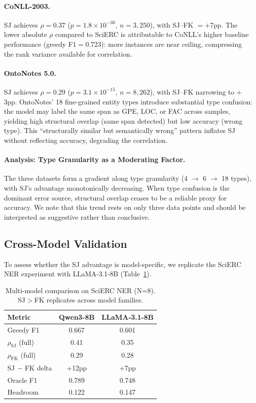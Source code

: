 \documentclass[11pt]{article}
\begin{document}
\paragraph{CoNLL-2003.}
SJ achieves $\rho{=}0.37$ ($p{=}1.8 \times 10^{-30}$, $n{=}3{,}250$), with SJ--FK $= +$7pp.
The lower absolute $\rho$ compared to SciERC is attributable to CoNLL's higher baseline performance (greedy F1$=$0.723): more instances are near ceiling, compressing the rank variance available for correlation.

\paragraph{OntoNotes 5.0.}
SJ achieves $\rho{=}0.29$ ($p{=}3.1 \times 10^{-15}$, $n{=}8{,}262$), with SJ--FK narrowing to $+$3pp.
OntoNotes' 18 fine-grained entity types introduce substantial type confusion: the model may label the same span as GPE, LOC, or FAC across samples, yielding high structural overlap (same span detected) but low accuracy (wrong type).
This ``structurally similar but semantically wrong'' pattern inflates SJ without reflecting accuracy, degrading the correlation.

\paragraph{Analysis: Type Granularity as a Moderating Factor.}
The three datasets form a gradient along type granularity (4 $\to$ 6 $\to$ 18 types), with SJ's advantage monotonically decreasing.
When type confusion is the dominant error source, structural overlap ceases to be a reliable proxy for accuracy.
We note that this trend rests on only three data points and should be interpreted as suggestive rather than conclusive.

\subsection{Cross-Model Validation}
\label{sec:cross_model}

To assess whether the SJ advantage is model-specific, we replicate the SciERC NER experiment with LLaMA-3.1-8B (Table~\ref{tab:multi_model}).

\begin{table}[t]
\centering
\caption{Multi-model comparison on SciERC NER (N=8). SJ$>$FK replicates across model families.}
\label{tab:multi_model}
\begin{tabular}{lcc}
\toprule
\textbf{Metric} & \textbf{Qwen3-8B} & \textbf{LLaMA-3.1-8B} \\
\midrule
Greedy F1             & 0.667 & 0.601 \\
$\rho_{\text{SJ}}$ (full) & 0.41  & 0.35 \\
$\rho_{\text{FK}}$ (full) & 0.29  & 0.28 \\
SJ $-$ FK delta       & +12pp & +7pp \\
Oracle F1             & 0.789 & 0.748 \\
Headroom              & 0.122 & 0.147 \\
\bottomrule
\end{tabular}
\end{table}
\end{document}
